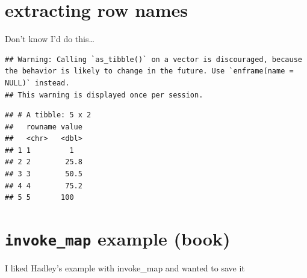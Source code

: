 \documentclass[]{book}
\newenvironment{Shaded}{\begin{snugshade}}{\end{snugshade}}
\newcommand{\DataTypeTok}[1]{\textcolor[rgb]{0.13,0.29,0.53}{#1}}
\newcommand{\DecValTok}[1]{\textcolor[rgb]{0.00,0.00,0.81}{#1}}
\newcommand{\KeywordTok}[1]{\textcolor[rgb]{0.13,0.29,0.53}{\textbf{#1}}}
\newcommand{\NormalTok}[1]{#1}
\newcommand{\OperatorTok}[1]{\textcolor[rgb]{0.81,0.36,0.00}{\textbf{#1}}}
\newcommand{\StringTok}[1]{\textcolor[rgb]{0.31,0.60,0.02}{#1}}
\theoremstyle{definition}
\theoremstyle{definition}
\theoremstyle{definition}
\theoremstyle{remark}
\begin{document}
\hypertarget{extracting-row-names}{%
\section{extracting row names}\label{extracting-row-names}}

Don't know I'd do this\ldots{}

\begin{Shaded}
\end{Shaded}

\begin{verbatim}
## Warning: Calling `as_tibble()` on a vector is discouraged, because the behavior is likely to change in the future. Use `enframe(name = NULL)` instead.
## This warning is displayed once per session.
\end{verbatim}

\begin{verbatim}
## # A tibble: 5 x 2
##   rowname value
##   <chr>   <dbl>
## 1 1         1  
## 2 2        25.8
## 3 3        50.5
## 4 4        75.2
## 5 5       100
\end{verbatim}

\hypertarget{invoke_map-example-book}{%
\section{\texorpdfstring{\texttt{invoke\_map} example
(book)}{invoke\_map example (book)}}\label{invoke_map-example-book}}

I liked Hadley's example with invoke\_map and wanted to save it

\begin{Shaded}
\end{Shaded}
\end{document}
